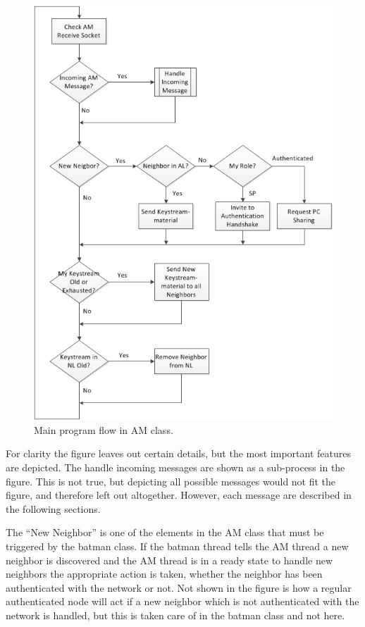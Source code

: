\begin{figure}[h!]
	\centering
	\includegraphics[width=\textwidth]{images/am_main_loop.png}
	\caption{Main program flow in AM class.}
	\label{fig:am_main_loop}
	\clearpage
\end{figure}

For clarity the figure leaves out certain details, but the most important
features are depicted. The handle incoming messages are shown as a sub-process
in the figure.  This is not true, but depicting all possible messages would not
fit the figure, and therefore left out altogether. However, each message are
described in the following sections.

The ``New Neighbor'' is one of the elements in the AM class that must be
triggered by the batman class. If the batman thread tells the AM thread a new
neighbor is discovered and the AM thread is in a ready state to handle new
neighbors the appropriate action is taken, whether the neighbor has been
authenticated with the network or not. Not shown in the figure is how a regular
authenticated node will act if a new neighbor which is not authenticated with
the network is handled, but this is taken care of in the batman class and not
here.

